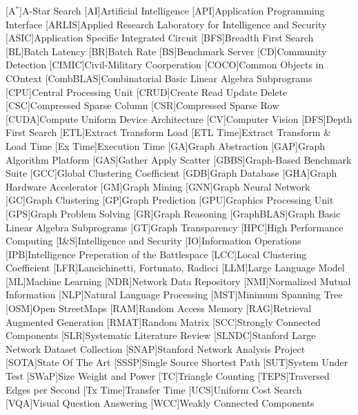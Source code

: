 
[A$^{*}$]{A-Star Search}
[AI]{Artificial Intelligence}
[API]{Application Programming Interface}
[ARLIS]{Applied Research Laboratory for Intelligence and Security}
[ASIC]{Application Specific Integrated Circuit}
[BFS]{Breadth First Search}
[BL]{Batch Latency}
[BR]{Batch Rate}
[BS]{Benchmark Server}
[CD]{Community Detection}
[CIMIC]{Civil-Military Coorperation}
[COCO]{Common Objects in COntext}
[CombBLAS]{Combinatorial Basic Linear Algebra Subprograms}
[CPU]{Central Processing Unit}
[CRUD]{Create Read Update Delete}
[CSC]{Compressed Sparse Column}
[CSR]{Compressed Sparse Row}
[CUDA]{Compute Uniform Device Architecture}
[CV]{Computer Vision}
[DFS]{Depth First Search}
[ETL]{Extract Transform Load}
[ETL Time]{Extract Transform \& Load Time}
[Ex Time]{Execution Time}
[GA]{Graph Abstraction}
[GAP]{Graph Algorithm Platform}
[GAS]{Gather Apply Scatter}
[GBBS]{Graph-Based Benchmark Suite}
[GCC]{Global Clustering Coefficient}
[GDB]{Graph Database}
[GHA]{Graph Hardware Accelerator}
[GM]{Graph Mining}
[GNN]{Graph Neural Network}
[GC]{Graph Clustering}
[GP]{Graph Prediction}
[GPU]{Graphics Processing Unit}
[GPS]{Graph Problem Solving}
[GR]{Graph Reasoning}
[GraphBLAS]{Graph Basic Linear Algebra Subprograms}
[GT]{Graph Transparency}
[HPC]{High Performance Computing}
[I\&S]{Intelligence and Security}
[IO]{Information Operations}
[IPB]{Intelligence Preperation of the Battlespace}
[LCC]{Local Clustering Coefficient}
[LFR]{Lancichinetti, Fortunato, Radicci}
[LLM]{Large Language Model}
[ML]{Machine Learning}
[NDR]{Network Data Repository}
[NMI]{Normalized Mutual Information}
[NLP]{Natural Language Processing}
[MST]{Minimum Spanning Tree}
[OSM]{Open StreetMaps}
[RAM]{Random Access Memory}
[RAG]{Retrieval Augmented Generation}
[RMAT]{Random Matrix}
[SCC]{Strongly Connected Components}
[SLR]{Systematic Literature Review}
[SLNDC]{Stanford Large Network Dataset Collection}
[SNAP]{Stanford Network Analysis Project}
[SOTA]{State Of The Art}
[SSSP]{Single Source Shortest Path}
[SUT]{System Under Test}
[SWaP]{Size Weight and Power}
[TC]{Triangle Counting}
[TEPS]{Traversed Edges per Second}
[Tx Time]{Transfer Time}
[UCS]{Uniform Cost Search}
[VQA]{Visual Question Answering}
[WCC]{Weakly Connected Components}